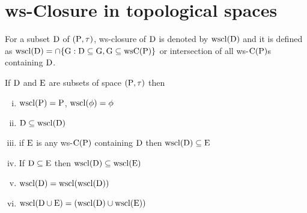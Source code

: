 \section{ws-Closure in topological spaces}\label{sec2.4}

\begin{dfn}\label{defi2.4.1} 
For a subset $\mathrm{D}$ of $(\mathrm{P}, \tau)$, ws-closure of $\mathrm{D}$ is denoted by $\mathrm{wscl}(\mathrm{D})$ and it is defined as $\mathrm{wscl}(\mathrm{D})=\cap \{\mathrm{G}: \mathrm{D}\subseteq \mathrm{G}, \mathrm{G}\subseteq \mathrm{ws}\mathrm{C}(\mathrm{P})\}$ or intersection of all ws-$\mathrm{C}(\mathrm{P})$s containing $\mathrm{D}$.
\end{dfn}

\begin{thm}\label{thm2.4.2}
If $\mathrm{D}$ and $\mathrm{E}$  are subsets of space $(\mathrm{P}, \tau)$ then
\begin{enumerate}[(i)]
\item $\mathrm{wscl}(\mathrm{P})=\mathrm{P}$, $\mathrm{wscl}(\phi)=\phi$
\item $\mathrm{D}\subseteq \mathrm{wscl}(\mathrm{D})$
\item if $\mathrm{E}$ is any ws-$\mathrm{C}(\mathrm{P})$ containing $\mathrm{D}$ then $\mathrm{wscl}(\mathrm{D})\subseteq \mathrm{E}$
\item If $\mathrm{D}\subseteq \mathrm{E}$ then $\mathrm{wscl}(\mathrm{D})\subseteq \mathrm{wscl}(\mathrm{E})$
\item $\mathrm{wscl}(\mathrm{D})=\mathrm{wscl}(\mathrm{wscl}(\mathrm{D}))$
\item $\mathrm{wscl}(\mathrm{D}\cup \mathrm{E})=(\mathrm{wscl}(\mathrm{D})\cup \mathrm{wscl}(\mathrm{E}))$
\end{enumerate}
\end{thm}


